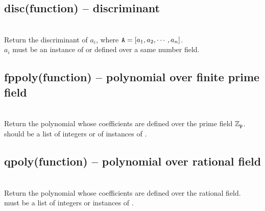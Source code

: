   \subsection{disc(function) -- discriminant}
   \\
  \spacing
  \quad Return the discriminant of $a_i$, where ${\texttt A} = [a_1, a_2, \cdots, a_n]$. \\
  \spacing
  $a_i$ must be an instance of  or  defined over a same number field.\\
%
  \subsection{fppoly(function) -- polynomial over finite prime field}
   \\
  \spacing
  \quad Return the polynomial whose coefficients  are defined over the prime field $\mathbb{Z}_{\texttt p}$. \\
  \spacing
  \quad {} should be a list of integers or of instances of .\\
%
%
  \subsection{qpoly(function) -- polynomial over rational field}
   \\
  \spacing
  \quad Return the polynomial whose coefficients  are defined over the rational field. \\
  \spacing
  \quad {} must be a list of integers or instances of .\\
%

